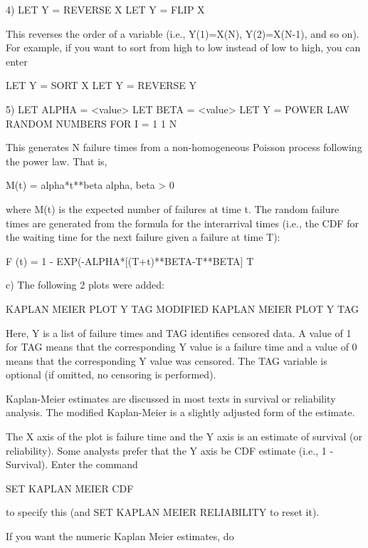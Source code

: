 {       4)   LET Y = REVERSE X
            LET Y = FLIP X
   
          This reverses the order of a variable (i.e., Y(1)=X(N),
          Y(2)=X(N-1), and so on).  For example, if you want to
          sort from high to low instead of low to high, you can enter
      
             LET Y = SORT X
             LET Y = REVERSE Y

       5)    LET ALPHA = <value>
             LET BETA = <value>
             LET Y = POWER LAW RANDOM NUMBERS FOR I = 1 1 N

          This generates N failure times from a non-homogeneous
          Poisson process following the power law.  That is,

             M(t) = alpha*t**beta     alpha, beta > 0

          where M(t) is the expected number of failures at time
          t.  The random failure times are generated from the
          formula for the interarrival times (i.e., the CDF for
          the waiting time for the next failure given a failure at
          time T):

             F (t) = 1 - EXP(-ALPHA*[(T+t)**BETA-T**BETA]
              T

    c) The following 2 plots were added:

          KAPLAN MEIER PLOT Y TAG
          MODIFIED KAPLAN MEIER PLOT Y TAG
   
       Here, Y is a list of failure times and TAG identifies censored
       data.  A value of 1 for TAG means that the corresponding Y
       value is a failure time and a value of 0 means that the 
       corresponding Y value was censored.  The TAG variable is
       optional (if omitted, no censoring is performed).
   
       Kaplan-Meier estimates are discussed in most texts in survival
       or reliability analysis.  The modified Kaplan-Meier is a
       slightly adjusted form of the estimate.
   
       The X axis of the plot is failure time and the Y axis is
       an estimate of survival (or reliability).  Some analysts
       prefer that the Y axis be CDF estimate (i.e., 1 - Survival).
       Enter the command
   
         SET KAPLAN MEIER CDF
   
       to specify this (and SET KAPLAN MEIER RELIABILITY to reset it).
   
       If you want the numeric Kaplan Meier estimates, do
   
}
